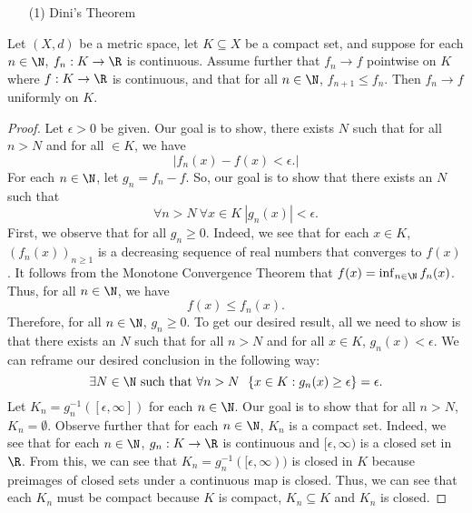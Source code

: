 \begin{enumerate}
    \item[(1)] Dini's Theorem
\end{enumerate}

\begin{theorem}[Rudin 7.13]
    Let \( (X,d) \) be a metric space, let \( K \subseteq  X   \) be a compact set, and suppose for each \( n \in \N  \), \( {f}_{n} : K \to \R  \) is continuous. Assume further that \( {f}_{n} \to f  \) pointwise on \( K  \) where \( f : K \to \R  \) is continuous, and that for all \( n \in \N  \), \( {f}_{n+1} \leq {f}_{n} \). Then \( {f}_{n} \to f  \) uniformly on \( K  \). 
\end{theorem}

\begin{proof}
Let \( \epsilon > 0 \) be given. Our goal is to show, there exists \( N  \) such that for all \( n > N  \) and for all \(  \in K  \), we have 
\[  | {f}_{n}(x) - f(x) < \epsilon. |  \]
For each \( n \in \N  \), let \( {g}_{n} = {f}_{n} - f  \). So, our goal is to show that there exists an \( N  \) such that 
\[  \forall n > N \ \forall x \in K \ | {g}_{n}(x) |  < \epsilon. \]
First, we observe that for all \( {g}_{n} \geq 0  \). Indeed, we see that for each \( x \in K  \), \( ({f}_{n}(x))_{n \geq 1 } \) is a decreasing sequence of real numbers that converges to \( f(x) \). It follows from the Monotone Convergence Theorem that \( f(x) = \inf_{n \in \N} {f}_{n}(x) \). Thus, for all \( n \in \N  \), we have
\[  f(x) \leq {f}_{n}(x). \]
Therefore, for all \( n \in \N  \), \( {g}_{n} \geq  0  \). To get our desired result, all we need to show is that there exists an \( N  \) such that for all \( n > N  \) and for all \( x \in K  \), \( {g}_{n}(x) < \epsilon \). We can reframe our desired conclusion in the following way: 
\[  \exists N \in \N \ \text{such that} \ \forall n > N \ \ \{ x \in K : {g}_{n}(x) \geq \epsilon  \}  = \epsilon. \] Let \( {K}_{n} = {g}_{n}^{-1}([\epsilon, \infty ]) \) for each \( n \in \N  \). Our goal is to show that for all \(  n > N  \), \( {K}_{n} = \emptyset \). Observe further that for each \( n \in \N  \), \( {K}_{n} \) is a compact set. Indeed, we see that for each \( n \in \N  \), \( {g}_{n} : K \to \R  \) is continuous and \( [\epsilon, \infty) \) is a closed set in \( \R  \). From this, we can see that \( {K}_{n} = {g}_{n}^{-1}([\epsilon,\infty) )  \) is closed in \( K  \) because preimages of closed sets under a continuous map is closed. Thus, we can see that each \( {K}_{n} \) must be compact because \( K  \) is compact, \( {K}_{n} \subseteq  K \)  and \( {K}_{n}  \) is closed. 
\end{proof}

